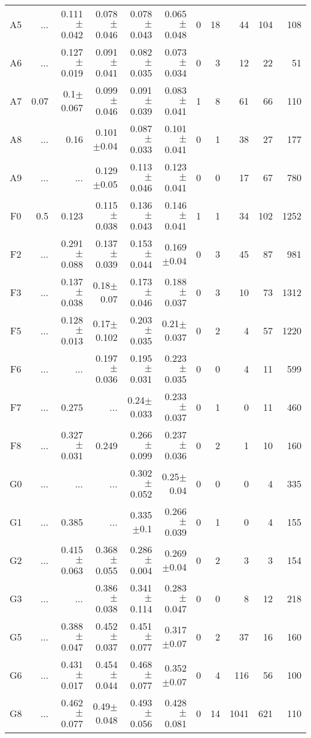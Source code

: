 \begin{table}[t]
\begin{center}
\begin{tabular}{c|rrrrr|rrrrr}
A5	&	 ...	&	0.111$\pm$0.042	&	0.078$\pm$0.046	&	0.078$\pm$0.043	&	0.065$\pm$0.048	&	0	&	18	&	44	&	104	&	108	\\
A6	&	 ...	&	0.127$\pm$0.019	&	0.091$\pm$0.041	&	0.082$\pm$0.035	&	0.073$\pm$0.034	&	0	&	3	&	12	&	22	&	51	\\
A7	&	0.07	&	0.1$\pm$0.067	&	0.099$\pm$0.046	&	0.091$\pm$0.039	&	0.083$\pm$0.041	&	1	&	8	&	61	&	66	&	110	\\
A8	&	 ...	&	0.16	&	0.101$\pm$0.04	&	0.087$\pm$0.033	&	0.101$\pm$0.041	&	0	&	1	&	38	&	27	&	177	\\
A9	&	 ...	&	 ...	&	0.129$\pm$0.05	&	0.113$\pm$0.046	&	0.123$\pm$0.041	&	0	&	0	&	17	&	67	&	780	\\
F0	&	0.5	&	0.123	&	0.115$\pm$0.038	&	0.136$\pm$0.043	&	0.146$\pm$0.041	&	1	&	1	&	34	&	102	&	1252	\\
F2	&	 ...	&	0.291$\pm$0.088	&	0.137$\pm$0.039	&	0.153$\pm$0.044	&	0.169$\pm$0.04	&	0	&	3	&	45	&	87	&	981	\\
F3	&	 ...	&	0.137$\pm$0.038	&	0.18$\pm$0.07	&	0.173$\pm$0.046	&	0.188$\pm$0.037	&	0	&	3	&	10	&	73	&	1312	\\
F5	&	 ...	&	0.128$\pm$0.013	&	0.17$\pm$0.102	&	0.203$\pm$0.035	&	0.21$\pm$0.037	&	0	&	2	&	4	&	57	&	1220	\\
F6	&	 ...	&	 ...	&	0.197$\pm$0.036	&	0.195$\pm$0.031	&	0.223$\pm$0.035	&	0	&	0	&	4	&	11	&	599	\\
F7	&	 ...	&	0.275	&	 ...	&	0.24$\pm$0.033	&	0.233$\pm$0.037	&	0	&	1	&	0	&	11	&	460	\\
F8	&	 ...	&	0.327$\pm$0.031	&	0.249	&	0.266$\pm$0.099	&	0.237$\pm$0.036	&	0	&	2	&	1	&	10	&	160	\\
G0	&	 ...	&	 ...	&	 ...	&	0.302$\pm$0.052	&	0.25$\pm$0.04	&	0	&	0	&	0	&	4	&	335	\\
G1	&	 ...	&	0.385	&	 ...	&	0.335$\pm$0.1	&	0.266$\pm$0.039	&	0	&	1	&	0	&	4	&	155	\\
G2	&	 ...	&	0.415$\pm$0.063	&	0.368$\pm$0.055	&	0.286$\pm$0.004	&	0.269$\pm$0.04	&	0	&	2	&	3	&	3	&	154	\\
G3	&	 ...	&	 ...	&	0.386$\pm$0.038	&	0.341$\pm$0.114	&	0.283$\pm$0.047	&	0	&	0	&	8	&	12	&	218	\\
G5	&	 ...	&	0.388$\pm$0.047	&	0.452$\pm$0.037	&	0.451$\pm$0.077	&	0.317$\pm$0.07	&	0	&	2	&	37	&	16	&	160	\\
G6	&	 ...	&	0.431$\pm$0.017	&	0.454$\pm$0.044	&	0.468$\pm$0.077	&	0.352$\pm$0.07	&	0	&	4	&	116	&	56	&	100	\\
G8	&	 ...	&	0.462$\pm$0.077	&	0.49$\pm$0.048	&	0.493$\pm$0.056	&	0.428$\pm$0.081	&	0	&	14	&	1041	&	621	&	110	\\

\end{tabular}
\end{center}
\end{table}
